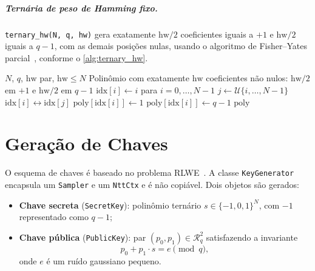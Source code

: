 \documentclass[11pt,a4paper]{report}
\newcommand{\Rq}{\mathcal{R}_q}
\begin{document}
\paragraph{Ternária de peso de Hamming fixo.} \texttt{ternary\_hw(N, q, hw)} gera
exatamente $\text{hw}/2$ coeficientes iguais a $+1$ e $\text{hw}/2$ iguais a $q-1$,
com as demais posições nulas, usando o algoritmo de Fisher--Yates
parcial~\cite{Knuth1997}, conforme o \cref{alg:ternary_hw}.

\begin{algorithm}[ht]
\caption{\texttt{ternary\_hw}: ternário de peso de Hamming fixo}
\label{alg:ternary_hw}
\begin{algorithmic}[1]
\Require $N$, $q$, $\text{hw}$ par, $\text{hw} \leq N$
\Ensure Polinômio com exatamente $\text{hw}$ coeficientes não nulos:
  $\text{hw}/2$ em $+1$ e $\text{hw}/2$ em $q-1$
\State $\text{idx}[i] \gets i$ para $i = 0, \ldots, N-1$
  \State $j \gets \mathcal{U}\{i, \ldots, N-1\}$
  \State $\text{idx}[i] \leftrightarrow \text{idx}[j]$
\EndFor
{}
  \State $\text{poly}[\text{idx}[i]] \gets 1$
\EndFor
{}
  \State $\text{poly}[\text{idx}[i]] \gets q - 1$
\EndFor
\State \Return $\text{poly}$
\end{algorithmic}
\end{algorithm}

\chapter{Geração de Chaves}
\label{cap:keygen}

O esquema de chaves é baseado no problema RLWE~\cite{LPR2010}. A classe
\texttt{KeyGenerator} encapsula um \texttt{Sampler} e um \texttt{NttCtx} e é não
copiável. Dois objetos são gerados:

\begin{itemize}
  \item \textbf{Chave secreta} (\texttt{SecretKey}): polinômio ternário
    $s \in \{-1, 0, 1\}^N$, com $-1$ representado como $q-1$;
  \item \textbf{Chave pública} (\texttt{PublicKey}): par $(p_0, p_1) \in \Rq^2$
    satisfazendo a invariante
    \begin{equation}
      p_0 + p_1 \cdot s = e \pmod{q},
      \label{eq:pk_invariant}
    \end{equation}
    onde $e$ é um ruído gaussiano pequeno.
\end{itemize}
\end{document}
